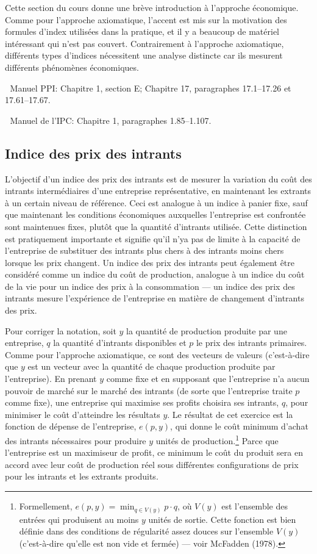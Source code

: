 \documentclass[]{article}
\begin{document}
Cette section du cours donne une brève introduction à l'approche économique. Comme pour l'approche axiomatique, l'accent est mis sur la motivation des formules d'index utilisées dans la pratique, et il y a beaucoup de matériel intéressant qui n'est pas couvert. Contrairement à l'approche axiomatique, différents types d'indices nécessitent une analyse distincte car ils mesurent différents phénomènes économiques.

📖 Manuel PPI: Chapitre 1, section E; Chapitre 17, paragraphes 17.1--17.26 et 17.61--17.67.

📖 Manuel de l'IPC: Chapitre 1, paragraphes 1.85--1.107.

\hypertarget{indice-des-prix-des-intrants}{%
\subsection{Indice des prix des intrants}\label{indice-des-prix-des-intrants}}

L'objectif d'un indice des prix des intrants est de mesurer la variation du coût des intrants intermédiaires d'une entreprise représentative, en maintenant les extrants à un certain niveau de référence. Ceci est analogue à un indice à panier fixe, sauf que maintenant les conditions économiques auxquelles l'entreprise est confrontée sont maintenues fixes, plutôt que la quantité d'intrants utilisée. Cette distinction est pratiquement importante et signifie qu'il n'ya pas de limite à la capacité de l'entreprise de substituer des intrants plus chers à des intrants moins chers lorsque les prix changent. Un indice des prix des intrants peut également être considéré comme un indice du coût de production, analogue à un indice du coût de la vie pour un indice des prix à la consommation --- un indice des prix des intrants mesure l'expérience de l'entreprise en matière de changement d'intrants des prix.

Pour corriger la notation, soit \(y\) la quantité de production produite par une entreprise, \(q\) la quantité d'intrants disponibles et \(p\) le prix des intrants primaires. Comme pour l'approche axiomatique, ce sont des vecteurs de valeurs (c'est-à-dire que \(y\) est un vecteur avec la quantité de chaque production produite par l'entreprise). En prenant \(y\) comme fixe et en supposant que l'entreprise n'a aucun pouvoir de marché sur le marché des intrants (de sorte que l'entreprise traite \(p\) comme fixe), une entreprise qui maximise ses profits choisira ses intrants, \(q\), pour minimiser le coût d'atteindre les résultats \(y\). Le résultat de cet exercice est la fonction de dépense de l'entreprise, \(e(p, y)\), qui donne le coût minimum d'achat des intrants nécessaires pour produire \(y\) unités de production.\footnote{Formellement, \(e(p, y) = \min_{q \in V(y)} p \cdot q\), où \(V(y)\) est l'ensemble des entrées qui produisent au moins \(y\) unités de sortie. Cette fonction est bien définie dans des conditions de régularité assez douces sur l'ensemble \(V(y)\) (c'est-à-dire qu'elle est non vide et fermée) --- voir McFadden (1978).} Parce que l'entreprise est un maximiseur de profit, ce minimum le coût du produit sera en accord avec leur coût de production réel sous différentes configurations de prix pour les intrants et les extrants produits.
\end{document}
